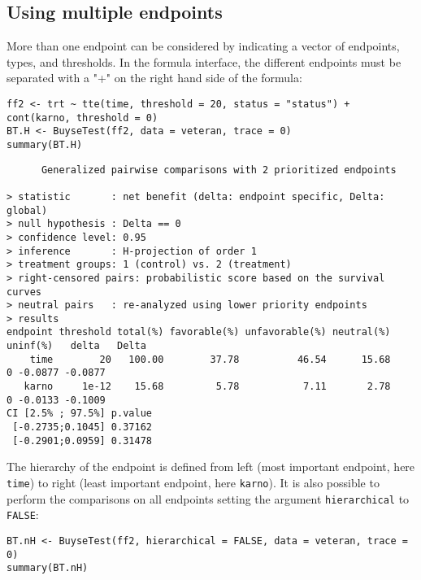 \documentclass[12pt]{article}
\begin{document}
\clearpage

\subsection{Using multiple endpoints}
\label{sec:orga2fb8e7}
More than one endpoint can be considered by indicating a vector of
endpoints, types, and thresholds. In the formula interface, the
different endpoints must be separated with a "+" on the right hand
side of the formula:
\lstset{language=r,label= ,caption= ,captionpos=b,numbers=none}
\begin{lstlisting}
ff2 <- trt ~ tte(time, threshold = 20, status = "status") + cont(karno, threshold = 0)
BT.H <- BuyseTest(ff2, data = veteran, trace = 0)
summary(BT.H)
\end{lstlisting}

\begin{verbatim}
      Generalized pairwise comparisons with 2 prioritized endpoints

> statistic       : net benefit (delta: endpoint specific, Delta: global) 
> null hypothesis : Delta == 0 
> confidence level: 0.95 
> inference       : H-projection of order 1
> treatment groups: 1 (control) vs. 2 (treatment) 
> right-censored pairs: probabilistic score based on the survival curves
> neutral pairs   : re-analyzed using lower priority endpoints
> results
endpoint threshold total(%) favorable(%) unfavorable(%) neutral(%) uninf(%)   delta   Delta
    time        20   100.00        37.78          46.54      15.68        0 -0.0877 -0.0877
   karno     1e-12    15.68         5.78           7.11       2.78        0 -0.0133 -0.1009
CI [2.5% ; 97.5%] p.value 
 [-0.2735;0.1045] 0.37162 
 [-0.2901;0.0959] 0.31478
\end{verbatim}

The hierarchy of the endpoint is defined from left (most important
endpoint, here \texttt{time}) to right (least important endpoint, here
\texttt{karno}). It is also possible to perform the comparisons on all
endpoints setting the argument \texttt{hierarchical} to \texttt{FALSE}:
\lstset{language=r,label= ,caption= ,captionpos=b,numbers=none}
\begin{lstlisting}
BT.nH <- BuyseTest(ff2, hierarchical = FALSE, data = veteran, trace = 0)
summary(BT.nH)
\end{lstlisting}
\end{document}
